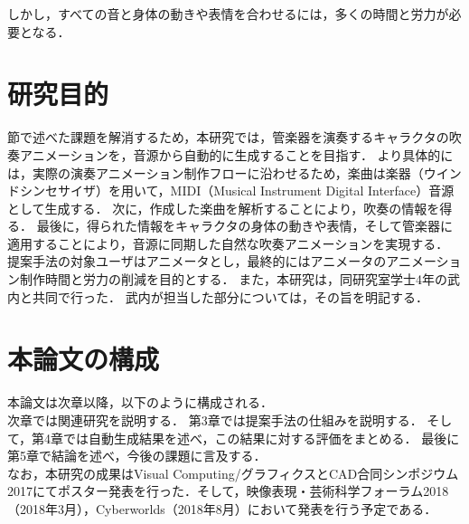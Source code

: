 しかし，すべての音と身体の動きや表情を合わせるには，多くの時間と労力が必要となる．

\section{研究目的}\label{sec:purpose}
\indent
{}節で述べた課題を解消するため，本研究では，管楽器を演奏するキャラクタの吹奏アニメーションを，音源から自動的に生成することを目指す．
より具体的には，実際の演奏アニメーション制作フローに沿わせるため，楽曲は楽器（ウインドシンセサイザ）を用いて，MIDI（Musical Instrument Digital Interface）音源として生成する．
次に，作成した楽曲を解析することにより，吹奏の情報を得る．
最後に，得られた情報をキャラクタの身体の動きや表情，そして管楽器に適用することにより，音源に同期した自然な吹奏アニメーションを実現する．
提案手法の対象ユーザはアニメータとし，最終的にはアニメータのアニメーション制作時間と労力の削減を目的とする．
また，本研究は，同研究室学士4年の武内と共同で行った．
武内が担当した部分については，その旨を明記する．

\section{本論文の構成}\label{sec:structure}
本論文は次章以降，以下のように構成される．\\
\indent
次章では関連研究を説明する．
第3章では提案手法の仕組みを説明する．
そして，第4章では自動生成結果を述べ，この結果に対する評価をまとめる．
最後に第5章で結論を述べ，今後の課題に言及する．\\
\indent
なお，本研究の成果はVisual Computing/グラフィクスとCAD合同シンポジウム2017にてポスター発表\cite{vc}を行った．そして，映像表現・芸術科学フォーラム2018（2018年3月），Cyberworlds（2018年8月）において発表を行う予定である．